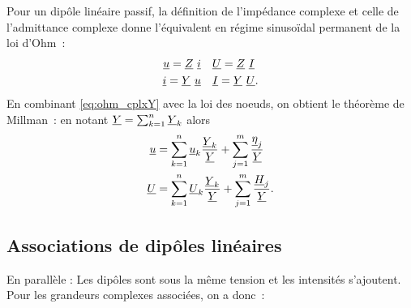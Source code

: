         Pour un dipôle linéaire passif, la définition de l'impédance complexe et celle de l'admittance complexe donne l'équivalent en régime sinusoïdal permanent de la loi d'Ohm~:
        \begin{align}
            \label{eq:ohm_cplxZ}    \underline{u} = \underline{Z} ~ \underline{i} &\quad \underline{U} = \underline{Z} ~ \underline{I} \\
            \label{eq:ohm_cplxY}    \underline{i} = \underline{Y} ~ \underline{u} &\quad \underline{I} = \underline{Y} ~ \underline{U}.
        \end{align}
        En combinant \eqref{eq:ohm_cplxY} avec la loi des noeuds, on obtient le théorème de Millman~: en notant $\underline{Y} = \sum_{k=1}^n \underline{Y}_k$ alors
        \begin{align}
            \underline{u} & = \sum_{k=1}^n \underline{u}_k \frac{\underline{Y}_k}{\underline{Y}} + \sum_{j=1}^m \frac{\underline{\eta}_j}{\underline{Y}} \\
            \underline{U} & = \sum_{k=1}^n \underline{U}_k \frac{\underline{Y}_k}{\underline{Y}} + \sum_{j=1}^m \frac{\underline{H}_j}{\underline{Y}}.
        \end{align}
    \subsection{Associations de dipôles linéaires}
    En parallèle : Les dipôles sont sous la même tension et les intensités s'ajoutent. Pour les grandeurs complexes associées, on a donc~: 
